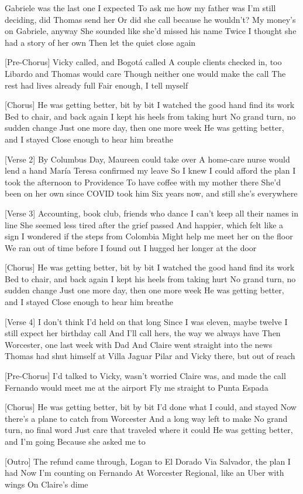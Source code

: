 \begin{lyrics}
[Verse 1]
Gabriele was the last one I expected
To ask me how my father was
I’m still deciding, did Thomas send her
Or did she call because he wouldn’t?
My money’s on Gabriele, anyway
She sounded like she’d missed his name
Twice I thought she had a story of her own
Then let the quiet close again

[Pre-Chorus]
Vicky called, and Bogotá called
A couple clients checked in, too
Libardo and Thomas would care
Though neither one would make the call
The rest had lives already full
Fair enough, I tell myself

[Chorus]
He was getting better, bit by bit
I watched the good hand find its work
Bed to chair, and back again
I kept his heels from taking hurt
No grand turn, no sudden change
Just one more day, then one more week
He was getting better, and I stayed
Close enough to hear him breathe

[Verse 2]
By Columbus Day, Maureen could take over
A home-care nurse would lend a hand
María Teresa confirmed my leave
So I knew I could afford the plan
I took the afternoon to Providence
To have coffee with my mother there
She’d been on her own since COVID took him
Six years now, and still she’s everywhere

[Verse 3]
Accounting, book club, friends who dance
I can’t keep all their names in line
She seemed less tired after the grief passed
And happier, which felt like a sign
I wondered if the steps from Colombia
Might help me meet her on the floor
We ran out of time before I found out
I hugged her longer at the door

[Chorus]
He was getting better, bit by bit
I watched the good hand find its work
Bed to chair, and back again
I kept his heels from taking hurt
No grand turn, no sudden change
Just one more day, then one more week
He was getting better, and I stayed
Close enough to hear him breathe

[Verse 4]
I don’t think I’d held on that long
Since I was eleven, maybe twelve
I still expect her birthday call
And I’ll call hers, the way we always have
Then Worcester, one last week with Dad
And Claire went straight into the news
Thomas had shut himself at Villa Jaguar
Pilar and Vicky there, but out of reach

[Pre-Chorus]
I’d talked to Vicky, wasn’t worried
Claire was, and made the call
Fernando would meet me at the airport
Fly me straight to Punta Espada

[Chorus]
He was getting better, bit by bit
I’d done what I could, and stayed
Now there’s a plane to catch from Worcester
And a long way left to make
No grand turn, no final word
Just care that traveled where it could
He was getting better, and I’m going
Because she asked me to

[Outro]
The refund came through, Logan to El Dorado
Via Salvador, the plan I had
Now I’m counting on Fernando
At Worcester Regional, like an Uber with wings
On Claire’s dime
\end{lyrics}

